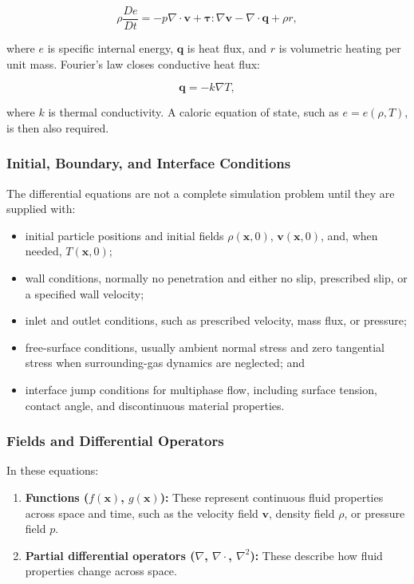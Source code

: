 \documentclass[11pt]{article}
\begin{document}
\begin{equation}
    \rho\frac{De}{Dt}
    = -p\nabla\cdot\mathbf{v}
    +\boldsymbol{\tau}:\nabla\mathbf{v}
    -\nabla\cdot\mathbf{q}
    +\rho r,
\end{equation}

where $e$ is specific internal energy, $\mathbf{q}$ is heat flux, and $r$ is
volumetric heating per unit mass. Fourier's law closes conductive heat flux:

\begin{equation}
    \mathbf{q}=-k\nabla T,
\end{equation}

where $k$ is thermal conductivity. A caloric equation of state, such as
$e=e(\rho,T)$, is then also required.

\subsubsection{Initial, Boundary, and Interface Conditions}

The differential equations are not a complete simulation problem until they
are supplied with:

\begin{itemize}
    \item initial particle positions and initial fields
    $\rho(\mathbf{x},0)$, $\mathbf{v}(\mathbf{x},0)$, and, when needed,
    $T(\mathbf{x},0)$;
    \item wall conditions, normally no penetration and either no slip,
    prescribed slip, or a specified wall velocity;
    \item inlet and outlet conditions, such as prescribed velocity, mass flux,
    or pressure;
    \item free-surface conditions, usually ambient normal stress and zero
    tangential stress when surrounding-gas dynamics are neglected; and
    \item interface jump conditions for multiphase flow, including surface
    tension, contact angle, and discontinuous material properties.
\end{itemize}

\subsubsection{Fields and Differential Operators}

In these equations:

\begin{enumerate}
    \item \textbf{Functions ($f(\mathbf{x})$, $g(\mathbf{x})$):} These represent
    continuous fluid properties across space and time, such as the velocity
    field $\mathbf{v}$, density field $\rho$, or pressure field $p$.
    \item \textbf{Partial differential operators
    ($\nabla$, $\nabla \cdot$, $\nabla^2$):} These describe how fluid
    properties change across space.
\end{enumerate}
\end{document}
